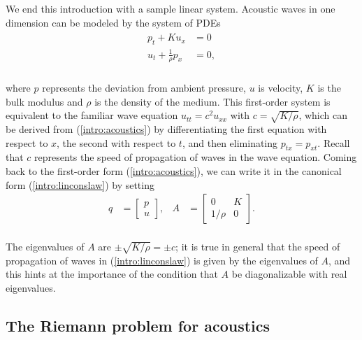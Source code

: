 \documentclass{SIAMbook2016}
\begin{document}
We end this introduction with a sample linear system. Acoustic waves in
one dimension can be modeled by the system of PDEs\\
\begin{align}
\begin{split} 
    p_t + K u_x & = 0 \\
    u_t + \frac{1}{\rho} p_x & = 0,
\end{split}  \label{intro:acoustics}
\end{align}\\
where \(p\) represents the deviation from ambient pressure, \(u\) is
velocity, \(K\) is the bulk modulus and \(\rho\) is the density of the
medium. This first-order system is equivalent to the familiar wave
equation \(u_{tt} = c^2 u_{xx}\) with \(c = \sqrt{K/\rho}\), which can
be derived from (\ref{intro:acoustics}) by differentiating the first
equation with respect to \(x\), the second with respect to \(t\), and
then eliminating \(p_{tx} = p_{xt}\). Recall that \(c\) represents the
speed of propagation of waves in the wave equation. Coming back to the
first-order form (\ref{intro:acoustics}), we can write it in the
canonical form (\ref{intro:linconslaw}) by setting\\
\begin{align*}
    q & = \begin{bmatrix} p \\ u \end{bmatrix}, &
    A & = \begin{bmatrix} 0 & K \\ 1/\rho & 0 \end{bmatrix}.
\end{align*}\\
The eigenvalues of \(A\) are \(\pm \sqrt{K/\rho} = \pm c\); it is true
in general that the speed of propagation of waves in
(\ref{intro:linconslaw}) is given by the eigenvalues of \(A\), and this
hints at the importance of the condition that \(A\) be diagonalizable
with real eigenvalues.

\hypertarget{the-riemann-problem-for-acoustics}{%
\subsection{The Riemann problem for
acoustics}\label{the-riemann-problem-for-acoustics}}
\end{document}
